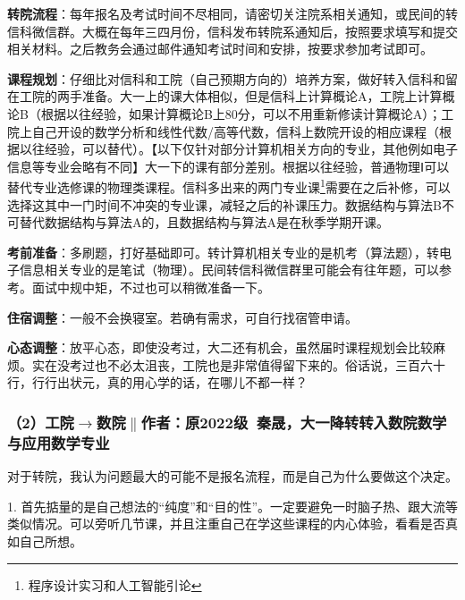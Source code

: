 \vspace{10pt}

\textbf{转院流程}：每年报名及考试时间不尽相同，请密切关注院系相关通知，或民间的转信科微信群。大概在每年三四月份，信科发布转院系通知后，按照要求填写和提交相关材料。之后教务会通过邮件通知考试时间和安排，按要求参加考试即可。

\vspace{10pt}

\textbf{课程规划}：仔细比对信科和工院（自己预期方向的）培养方案，做好转入信科和留在工院的两手准备。大一上的课大体相似，但是信科上计算概论A，工院上计算概论B（根据以往经验，如果计算概论B上80分，可以不用重新修读计算概论A）；工院上自己开设的数学分析和线性代数/高等代数，信科上数院开设的相应课程（根据以往经验，可以替代）。【以下仅针对部分计算机相关方向的专业，其他例如电子信息等专业会略有不同】大一下的课有部分差别。根据以往经验，普通物理Ⅰ可以替代专业选修课的物理类课程。信科多出来的两门专业课\footnote{程序设计实习和人工智能引论}需要在之后补修，可以选择这其中一门时间不冲突的专业课，减轻之后的补课压力。数据结构与算法B不可替代数据结构与算法A的，且数据结构与算法A是在秋季学期开课。

\vspace{10pt}

\textbf{考前准备}：多刷题，打好基础即可。转计算机相关专业的是机考（算法题），转电子信息相关专业的是笔试（物理）。民间转信科微信群里可能会有往年题，可以参考。面试中规中矩，不过也可以稍微准备一下。

\vspace{10pt}

\textbf{住宿调整}：一般不会换寝室。若确有需求，可自行找宿管申请。

\vspace{10pt}

\textbf{心态调整}：放平心态，即使没考过，大二还有机会，虽然届时课程规划会比较麻烦。实在没考过也不必太沮丧，工院也是非常值得留下来的。俗话说，三百六十行，行行出状元，真的用心学的话，在哪儿不都一样？

\subsubsection{（2）工院$\to$数院$\parallel$作者：原2022级\ 秦晟，大一降转转入数院数学与应用数学专业}
对于转院，我认为问题最大的可能不是报名流程，而是自己为什么要做这个决定。

\vspace{10pt}

1. 首先掂量的是自己想法的“纯度”和“目的性”。一定要避免一时脑子热、跟大流等类似情况。可以旁听几节课，并且注重自己在学这些课程的内心体验，看看是否真如自己所想。

